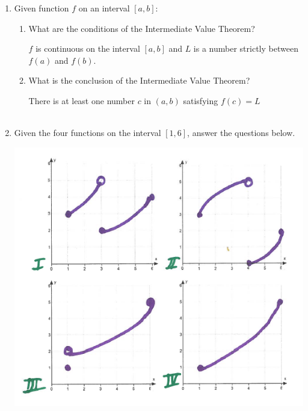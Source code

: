 \documentclass[nooutcomes]{ximera}
\begin{document}
\begin{problem} \hfil
\begin{enumerate}

\item Given function $f$ on an interval $[a,b]$:

\begin{enumerate}
\item What are the conditions of the Intermediate Value Theorem?

	\begin{freeResponse}
$f$ is continuous on the interval $[a,b]$ and $L$ is a number strictly between $f(a)$ and $f(b)$.
	\end{freeResponse}
\item What is the conclusion of the Intermediate Value Theorem?
	\begin{freeResponse}
There is at least one number $c$ in $(a,b)$ satisfying $f(c)=L$ \\\\
	\end{freeResponse}

\end{enumerate}
	\item Given the four functions on the interval $[1,6]$, answer the questions below.
	
	\begin{image}
	\includegraphics[scale=.6]{Figure2.png}
	\end{image}


\end{enumerate}
\end{problem}
\end{document}

